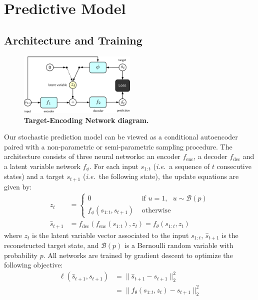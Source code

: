\documentclass{article}
\begin{document}
\section{Predictive Model}

\subsection{Architecture and Training}

\begin{figure}
  \centering
  \includegraphics[width=0.5\textwidth]{images/ae_train-crop.pdf}
  \caption{
    \textbf{Target-Encoding Network diagram.}
  }
\end{figure}

Our stochastic prediction model can be viewed as a conditional autoencoder paired with a non-parametric  or semi-parametric sampling procedure.
The architecture consists of three neural networks: an encoder $f_\text{enc}$, a decoder $f_\text{dec}$ and a latent variable network $f_\phi$.
For each input $s_{1:t}$ (\emph{i.e.}\ a sequence of $t$ consecutive states) and a target $s_{t+1}$ (\emph{i.e.}\ the following state), the update equations are given by:
%
\begin{align}
  \label{update-eqn}
  z_t &=
  \begin{cases}
    0 & \mbox{   if   } u = 1, \mbox{   } u \sim \mathcal{B}(p) \\
    f_\phi(s_{1:t}, s_{t+1}) & \mbox{   otherwise}
  \end{cases} \\
  \hat{s}_{t+1} &= f_\text{dec}(f_\text{enc}(s_{1:t}), z_t) = f_\theta(s_{1:t}, z_t)
\end{align}
%
where $z_t$ is the latent variable vector associated to the input $s_{1:t}$, $\hat{s}_{t + 1}$ is the reconstructed target state, and $\mathcal{B}(p)$ is a Bernoulli random variable with probability $p$.
All networks are trained by gradient descent to optimize the following objective:
%
\begin{align}
  \ell(\hat{s}_{t+1}, s_{t+1}) &= \lVert \hat{s}_{t+1} - s_{t+1} \rVert_2^2 \\
  &= \lVert f_\theta(s_{1:t}, z_t) - s_{t+1} \rVert_2^2
\end{align}
\end{document}
